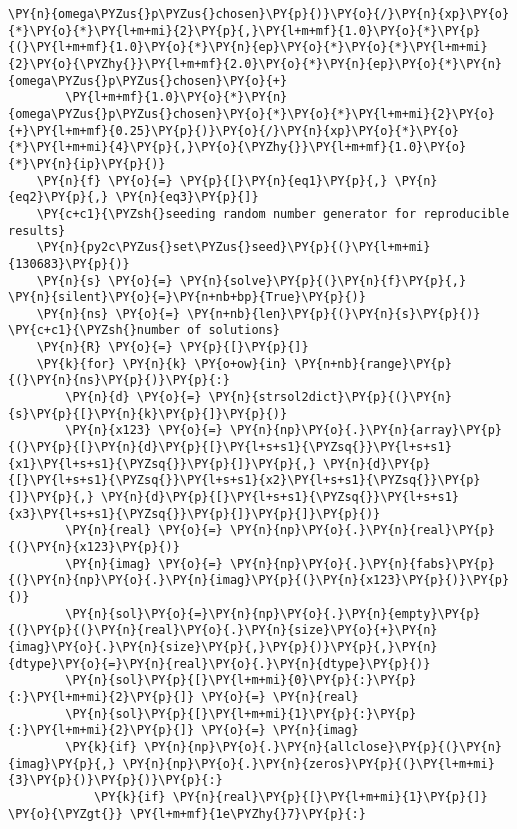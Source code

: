 \begin{Verbatim}[commandchars=\\\{\}]
        \PY{n}{omega\PYZus{}p\PYZus{}chosen}\PY{p}{)}\PY{o}{/}\PY{n}{xp}\PY{o}{*}\PY{o}{*}\PY{l+m+mi}{2}\PY{p}{,}\PY{l+m+mf}{1.0}\PY{o}{*}\PY{p}{(}\PY{l+m+mf}{1.0}\PY{o}{*}\PY{n}{ep}\PY{o}{*}\PY{o}{*}\PY{l+m+mi}{2}\PY{o}{\PYZhy{}}\PY{l+m+mf}{2.0}\PY{o}{*}\PY{n}{ep}\PY{o}{*}\PY{n}{omega\PYZus{}p\PYZus{}chosen}\PY{o}{+}
        \PY{l+m+mf}{1.0}\PY{o}{*}\PY{n}{omega\PYZus{}p\PYZus{}chosen}\PY{o}{*}\PY{o}{*}\PY{l+m+mi}{2}\PY{o}{+}\PY{l+m+mf}{0.25}\PY{p}{)}\PY{o}{/}\PY{n}{xp}\PY{o}{*}\PY{o}{*}\PY{l+m+mi}{4}\PY{p}{,}\PY{o}{\PYZhy{}}\PY{l+m+mf}{1.0}\PY{o}{*}\PY{n}{ip}\PY{p}{)}
    \PY{n}{f} \PY{o}{=} \PY{p}{[}\PY{n}{eq1}\PY{p}{,} \PY{n}{eq2}\PY{p}{,} \PY{n}{eq3}\PY{p}{]}
    \PY{c+c1}{\PYZsh{}seeding random number generator for reproducible results}
    \PY{n}{py2c\PYZus{}set\PYZus{}seed}\PY{p}{(}\PY{l+m+mi}{130683}\PY{p}{)}
    \PY{n}{s} \PY{o}{=} \PY{n}{solve}\PY{p}{(}\PY{n}{f}\PY{p}{,} \PY{n}{silent}\PY{o}{=}\PY{n+nb+bp}{True}\PY{p}{)}
    \PY{n}{ns} \PY{o}{=} \PY{n+nb}{len}\PY{p}{(}\PY{n}{s}\PY{p}{)}  \PY{c+c1}{\PYZsh{}number of solutions}
    \PY{n}{R} \PY{o}{=} \PY{p}{[}\PY{p}{]}
    \PY{k}{for} \PY{n}{k} \PY{o+ow}{in} \PY{n+nb}{range}\PY{p}{(}\PY{n}{ns}\PY{p}{)}\PY{p}{:}
        \PY{n}{d} \PY{o}{=} \PY{n}{strsol2dict}\PY{p}{(}\PY{n}{s}\PY{p}{[}\PY{n}{k}\PY{p}{]}\PY{p}{)}
        \PY{n}{x123} \PY{o}{=} \PY{n}{np}\PY{o}{.}\PY{n}{array}\PY{p}{(}\PY{p}{[}\PY{n}{d}\PY{p}{[}\PY{l+s+s1}{\PYZsq{}}\PY{l+s+s1}{x1}\PY{l+s+s1}{\PYZsq{}}\PY{p}{]}\PY{p}{,} \PY{n}{d}\PY{p}{[}\PY{l+s+s1}{\PYZsq{}}\PY{l+s+s1}{x2}\PY{l+s+s1}{\PYZsq{}}\PY{p}{]}\PY{p}{,} \PY{n}{d}\PY{p}{[}\PY{l+s+s1}{\PYZsq{}}\PY{l+s+s1}{x3}\PY{l+s+s1}{\PYZsq{}}\PY{p}{]}\PY{p}{]}\PY{p}{)}
        \PY{n}{real} \PY{o}{=} \PY{n}{np}\PY{o}{.}\PY{n}{real}\PY{p}{(}\PY{n}{x123}\PY{p}{)}
        \PY{n}{imag} \PY{o}{=} \PY{n}{np}\PY{o}{.}\PY{n}{fabs}\PY{p}{(}\PY{n}{np}\PY{o}{.}\PY{n}{imag}\PY{p}{(}\PY{n}{x123}\PY{p}{)}\PY{p}{)}
        \PY{n}{sol}\PY{o}{=}\PY{n}{np}\PY{o}{.}\PY{n}{empty}\PY{p}{(}\PY{p}{(}\PY{n}{real}\PY{o}{.}\PY{n}{size}\PY{o}{+}\PY{n}{imag}\PY{o}{.}\PY{n}{size}\PY{p}{,}\PY{p}{)}\PY{p}{,}\PY{n}{dtype}\PY{o}{=}\PY{n}{real}\PY{o}{.}\PY{n}{dtype}\PY{p}{)}
        \PY{n}{sol}\PY{p}{[}\PY{l+m+mi}{0}\PY{p}{:}\PY{p}{:}\PY{l+m+mi}{2}\PY{p}{]} \PY{o}{=} \PY{n}{real}
        \PY{n}{sol}\PY{p}{[}\PY{l+m+mi}{1}\PY{p}{:}\PY{p}{:}\PY{l+m+mi}{2}\PY{p}{]} \PY{o}{=} \PY{n}{imag}
        \PY{k}{if} \PY{n}{np}\PY{o}{.}\PY{n}{allclose}\PY{p}{(}\PY{n}{imag}\PY{p}{,} \PY{n}{np}\PY{o}{.}\PY{n}{zeros}\PY{p}{(}\PY{l+m+mi}{3}\PY{p}{)}\PY{p}{)}\PY{p}{:}
            \PY{k}{if} \PY{n}{real}\PY{p}{[}\PY{l+m+mi}{1}\PY{p}{]} \PY{o}{\PYZgt{}} \PY{l+m+mf}{1e\PYZhy{}7}\PY{p}{:}

\end{Verbatim}
